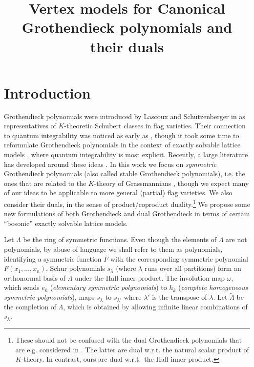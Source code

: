 \documentclass[ALCO, Unicode]{cedram}
\title{Vertex models for Canonical Grothendieck polynomials and their duals}
\author{\firstname{Ajeeth} \lastname{Gunna}}
\author{\firstname{Paul} \lastname{Zinn-Justin}}
\begin{document}
\maketitle


\section{Introduction}
Grothendieck polynomials were introduced by Lascoux and Schutzenberger in \cite{LS-groth} as representatives of $K$-theoretic Schubert classes in flag varieties. Their connection to quantum integrability was noticed as early as \cite{FK-Groth}, though it took some time to reformulate Grothendieck polynomials in the context of exactly solvable lattice models \cite{hdr}, where quantum integrability is most explicit. Recently, a large literature has developed around these ideas \cite{Bs-coloreddoublegroth, artic71, Ms-grothmodel, Ms-bosfer-ktheory, artic68}. In this work we focus on {\em symmetric}\/ Grothendieck polynomials (also called stable Grothendieck polynomials), i.e. the ones that are related to the $K$-theory of Grassmannians \cite{BuchKGr}, though we expect many of our ideas to be applicable to more general (partial) flag varieties. We also consider their duals, in the sense of product/coproduct duality.\footnote{These should not be confused with the dual Grothendieck polynomials that are e.g. considered in \cite{artic68}. The latter are dual w.r.t. the natural scalar product of $K$-theory. In contrast, ours are dual w.r.t.\ the Hall inner product.} We propose some new formulations of both Grothendieck and dual Grothendieck in terms of certain ``bosonic'' exactly solvable lattice models.

Let $\Lambda$ be the ring of symmetric functions. Even though the elements of ${\Lambda}$ are not polynomials, by abuse of language we shall refer to them as polynomials, identifying a symmetric function $F$ with the corresponding symmetric polynomial $F(x_1,\ldots,x_n)$. Schur polynomials $s_{\lambda}$ (where $\lambda$ runs over all partitions) form an orthonormal basis of $\Lambda$ under the Hall inner product. The involution map $\omega$, which sends $e_{k}$ (\emph{elementary symmetric polynomials}) to $h_{k}$ (\emph{complete homogeneous symmetric polynomials}), maps $s_{\lambda}$ to $s_{\lambda'}$ where $\lambda'$ is the transpose of $\lambda$. Let $\tilde{\Lambda}$ be the completion of $\Lambda$, which is obtained by allowing infinite linear combinations of $s_{\lambda}$.
\end{document}
